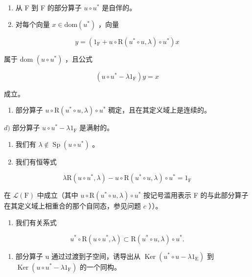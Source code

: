 \begin{enumerate}
\def\labelenumi{\alph{enumi})}
\item
  从 F 到 F 的部分算子 \(u \circ u^{*}\) 是自伴的。
\item
  对每个向量 \(x \in \mathrm{dom}(u^{*})\) ，向量
\end{enumerate}

\[
y = (1 _ {\mathrm{F}} + u \circ \mathrm{R} (u ^ {*} \circ u, \lambda) \circ u ^ {*}) x
\]

属于 dom \((u\circ u^{*})\) ，且公式

\[
(u \circ u ^ {*} - \lambda 1 _ {\mathrm{F}}) y = x
\]

成立。

\begin{enumerate}
\def\labelenumi{\alph{enumi})}
\setcounter{enumi}{2}
\tightlist
\item
  部分算子 \(u \circ \mathrm{R}(u^* \circ u, \lambda) \circ u^*\) 稠定，且在其定义域上是连续的。
\end{enumerate}

\(d)\) 部分算子 \(u \circ u^{*} - \lambda 1_{\mathrm{F}}\) 是满射的。

\begin{enumerate}
\def\labelenumi{\alph{enumi})}
\setcounter{enumi}{4}
\item
  我们有 \(\lambda \notin \operatorname{Sp}(u \circ u^{*})\) 。
\item
  我们有恒等式
\end{enumerate}

\[
\lambda \mathrm{R} (u \circ u ^ {*}, \lambda) - u \circ \mathrm{R} (u ^ {*} \circ u, \lambda) \circ u ^ {*} = 1 _ {\mathrm{F}}
\]

在 \(\mathcal{L}(\mathrm{F})\) 中成立（其中 \(u\circ \mathrm{R}(u^{*}\circ u,\lambda)\circ u^{*}\) 按记号滥用表示 F 的与此部分算子在其定义域上相重合的那个自同态，参见问题 \(c\) ））。

\begin{enumerate}
\def\labelenumi{\alph{enumi})}
\setcounter{enumi}{6}
\tightlist
\item
  我们有关系式
\end{enumerate}

\[
u ^ {*} \circ \mathrm{R} (u \circ u ^ {*}, \lambda) \subset \mathrm{R} (u ^ {*} \circ u, \lambda) \circ u ^ {*}.
\]

\begin{enumerate}
\def\labelenumi{\alph{enumi})}
\setcounter{enumi}{7}
\tightlist
\item
  部分算子 u 通过过渡到子空间，诱导出从 \(\operatorname{Ker}(u^{*} \circ u - \lambda1_{\mathrm{E}})\) 到 \(\operatorname{Ker}(u \circ u^{*} - \lambda1_{\mathrm{F}})\) 的一个同构。
\end{enumerate}

